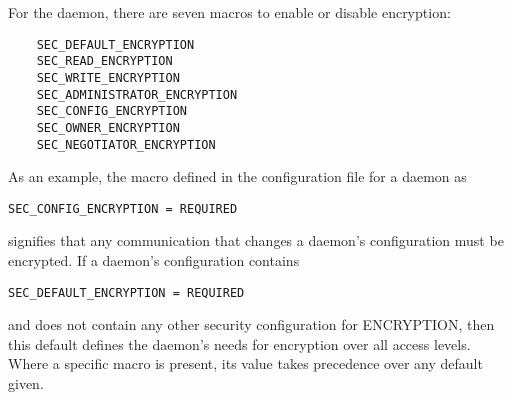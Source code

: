 For the daemon, there are seven macros to enable or disable encryption:
\begin{verbatim}
    SEC_DEFAULT_ENCRYPTION
    SEC_READ_ENCRYPTION
    SEC_WRITE_ENCRYPTION
    SEC_ADMINISTRATOR_ENCRYPTION
    SEC_CONFIG_ENCRYPTION
    SEC_OWNER_ENCRYPTION
    SEC_NEGOTIATOR_ENCRYPTION
\end{verbatim}

As an example, the macro defined in the configuration file
for a daemon as
\begin{verbatim}
SEC_CONFIG_ENCRYPTION = REQUIRED
\end{verbatim}
signifies that any communication that changes a daemon's configuration
must be encrypted.
If a daemon's configuration contains
\begin{verbatim}
SEC_DEFAULT_ENCRYPTION = REQUIRED
\end{verbatim}
and does not contain any other security configuration for
ENCRYPTION, then this default defines the daemon's needs
for encryption over all access levels.
Where a specific macro is present, its value takes
precedence over any default given.

